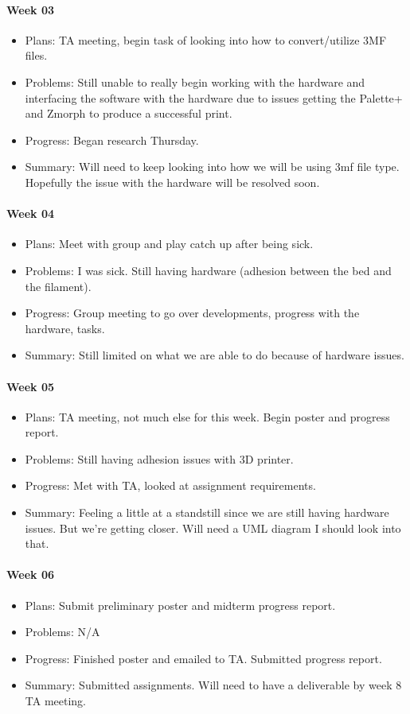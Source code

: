 \paragraph{Week 03}
\begin{itemize}
\item Plans:  TA meeting, begin task of looking into how to convert/utilize 3MF files.
\item Problems: Still unable to really begin working with the hardware and interfacing the software with the hardware due to issues getting the Palette+ and Zmorph to produce a successful print.
\item Progress: Began research Thursday.
\item Summary: Will need to keep looking into how we will be using 3mf file type. 
Hopefully the issue with the hardware will be resolved soon.
\end{itemize}
\paragraph{Week 04}
\begin{itemize}
\item Plans:  Meet with group and play catch up after being sick.
\item Problems: I was sick.
Still having hardware (adhesion between the bed and the filament).
\item Progress: Group meeting to go over developments, progress with the hardware, tasks.
\item Summary: Still limited on what we are able to do because of hardware issues. 
\end{itemize}
\paragraph{Week 05}
\begin{itemize}
\item Plans: TA meeting, not much else for this week. 
Begin poster and progress report.
\item Problems: Still having adhesion issues with 3D printer. 
\item Progress: Met with TA, looked at assignment requirements.
\item Summary: Feeling a little at a standstill since we are still having hardware issues. 
But we're getting closer. 
Will need a UML diagram I should look into that.
\end{itemize}
\paragraph{Week 06}
\begin{itemize}
\item Plans:  Submit preliminary poster and midterm progress report.
\item Problems: N/A
\item Progress: Finished poster and emailed to TA. 
Submitted progress report.
\item Summary: Submitted assignments. 
Will need to have a deliverable by week 8 TA meeting.
\end{itemize}
